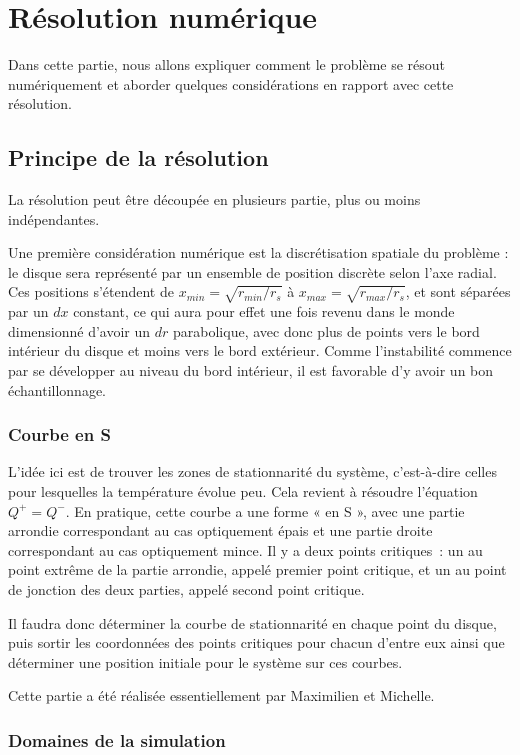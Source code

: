 \section{Résolution numérique}

Dans cette partie, nous allons expliquer comment le problème se résout
numériquement et aborder quelques considérations en rapport avec cette
résolution.

\subsection{Principe de la résolution}
La résolution peut être découpée en plusieurs partie, plus ou moins
indépendantes.

Une première considération numérique est la discrétisation spatiale du problème
: le disque sera représenté par un ensemble de position discrète selon l’axe
radial. Ces positions s’étendent de $x_{min} = \sqrt{r_{min}/r_s}$ à $x_{max} =
\sqrt{r_{max}/r_s}$, et sont séparées par un $dx$ constant, ce qui aura pour
effet une fois revenu dans le monde dimensionné d’avoir un $dr$ parabolique,
avec donc plus de points vers le bord intérieur du disque et moins vers le bord
extérieur. Comme l'instabilité commence par se développer au niveau du bord intérieur, il est favorable d'y avoir un bon échantillonnage.

\subsubsection{Courbe en S}

L’idée ici est de trouver les zones de stationnarité du système, c’est-à-dire
celles pour lesquelles la température évolue peu. Cela revient à résoudre
l’équation $Q^+ = Q^-$. En pratique, cette courbe a une forme « en S », avec
une partie arrondie correspondant au cas optiquement épais et une partie droite
correspondant au cas optiquement mince. Il y a deux points critiques : un au
point extrême de la partie arrondie, appelé premier point critique, et un au
point de jonction des deux parties, appelé second point critique.

Il faudra donc déterminer la courbe de stationnarité en chaque point du disque,
puis sortir les coordonnées des points critiques pour chacun d’entre eux ainsi
que déterminer une position initiale pour le système sur ces courbes.

Cette partie a été réalisée essentiellement par Maximilien et Michelle.

\subsubsection{Domaines de la simulation}

